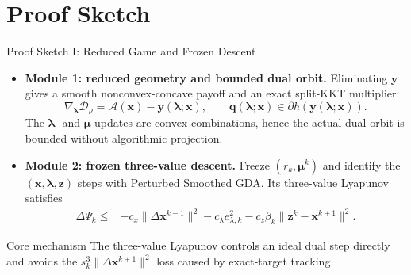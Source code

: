 \documentclass[handout,compress,9pt]{beamer}
\newcommand{\red}[1]{\textcolor{ddlred}{#1}}
\newcommand{\bx}{\bm{x}}
\newcommand{\by}{\bm{y}}
\newcommand{\bz}{\bm{z}}
\newcommand{\bq}{\bm{q}}
\newcommand{\bmu}{\bm{\mu}}
\newcommand{\blmbd}{\bm{\lambda}}
\newcommand{\calA}{\mathcal{A}}
\begin{document}
\section{Proof Sketch}

\begin{frame}{Proof Sketch I: Reduced Game and Frozen Descent}
\footnotesize
\begin{itemize}
  \setlength{\itemsep}{0.18cm}
  \item[\red{$\blacktriangleright$}]
  \textbf{Module 1: reduced geometry and bounded dual orbit.}
  Eliminating $\by$ gives a smooth nonconvex-concave payoff and an exact
  split-KKT multiplier:
  \begin{equation*}
    \nabla_{\blmbd}\mathcal D_\rho=\calA(\bx)-\by(\blmbd;\bx),
    \qquad
    \bq(\blmbd;\bx)\in\partial h(\by(\blmbd;\bx)).
  \end{equation*}
  The $\blmbd$- and $\bmu$-updates are convex combinations, hence the actual
  dual orbit is bounded without algorithmic projection.
  \hfill\hyperlink{appendix:candidate-geometry}{}

  \item[\red{$\blacktriangleright$}]
  \textbf{Module 2: frozen three-value descent.}
  Freeze $(r_k,\bmu^k)$ and identify the $(\bx,\blmbd,\bz)$ steps with
  Perturbed Smoothed GDA.  Its three-value Lyapunov satisfies
  \begin{equation*}
  \begin{aligned}
    \Delta\Psi_k\le{}&-c_x\|\Delta\bx^{k+1}\|^2
    -c_\lambda e_{\lambda,k}^2
    -c_z\beta_k\|\bz^k-\bx^{k+1}\|^2.
  \end{aligned}
  \end{equation*}
  \hfill\hyperlink{appendix:candidate-frozen}{}
\end{itemize}
\begin{block}{Core mechanism}
The three-value Lyapunov controls an ideal dual step directly and avoids the
$s_k^3\|\Delta\bx^{k+1}\|^2$ loss caused by exact-target tracking.
\end{block}
\end{frame}
\end{document}
